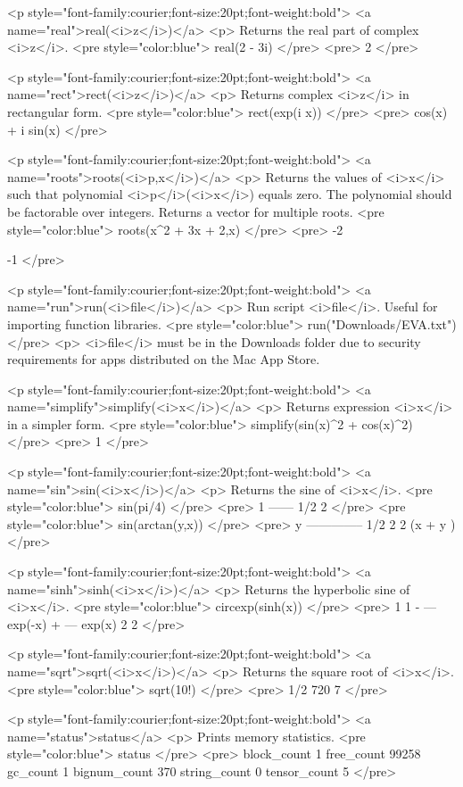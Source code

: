 <p style="font-family:courier;font-size:20pt;font-weight:bold">
<a name="real">real(<i>z</i>)</a>
<p>
Returns the real part of complex <i>z</i>.
<pre style="color:blue">
real(2 - 3i)
</pre>
<pre>
2
</pre>

<p style="font-family:courier;font-size:20pt;font-weight:bold">
<a name="rect">rect(<i>z</i>)</a>
<p>
Returns complex <i>z</i> in rectangular form.
<pre style="color:blue">
rect(exp(i x))
</pre>
<pre>
cos(x) + i sin(x)
</pre>

<p style="font-family:courier;font-size:20pt;font-weight:bold">
<a name="roots">roots(<i>p,x</i>)</a>
<p>
Returns the values of <i>x</i> such that polynomial
<i>p</i>(<i>x</i>) equals zero.
The polynomial should be factorable over integers.
Returns a vector for multiple roots.
<pre style="color:blue">
roots(x^2 + 3x + 2,x)
</pre>
<pre>
-2

-1
</pre>

<p style="font-family:courier;font-size:20pt;font-weight:bold">
<a name="run">run(<i>file</i>)</a>
<p>
Run script <i>file</i>.
Useful for importing function libraries.
<pre style="color:blue">
run("Downloads/EVA.txt")
</pre>
<p>
<i>file</i> must be in the Downloads folder due to security requirements for apps distributed on the Mac App Store.

<p style="font-family:courier;font-size:20pt;font-weight:bold">
<a name="simplify">simplify(<i>x</i>)</a>
<p>
Returns expression <i>x</i> in a simpler form.
<pre style="color:blue">
simplify(sin(x)^2 + cos(x)^2)
</pre>
<pre>
1
</pre>

<p style="font-family:courier;font-size:20pt;font-weight:bold">
<a name="sin">sin(<i>x</i>)</a>
<p>
Returns the sine of <i>x</i>.
<pre style="color:blue">
sin(pi/4)
</pre>
<pre>
  1
------
  1/2
 2
</pre>
<pre style="color:blue">
sin(arctan(y,x))
</pre>
<pre>
      y
--------------
          1/2
   2    2
 (x  + y )
</pre>

<p style="font-family:courier;font-size:20pt;font-weight:bold">
<a name="sinh">sinh(<i>x</i>)</a>
<p>
Returns the hyperbolic sine of <i>x</i>.
<pre style="color:blue">
circexp(sinh(x))
</pre>
<pre>
   1             1
- --- exp(-x) + --- exp(x)
   2             2
</pre>

<p style="font-family:courier;font-size:20pt;font-weight:bold">
<a name="sqrt">sqrt(<i>x</i>)</a>
<p>
Returns the square root of <i>x</i>.
<pre style="color:blue">
sqrt(10!)
</pre>
<pre>
     1/2
720 7
</pre>

<p style="font-family:courier;font-size:20pt;font-weight:bold">
<a name="status">status</a>
<p>
Prints memory statistics.
<pre style="color:blue">
status
</pre>
<pre>
block_count 1
free_count 99258
gc_count 1
bignum_count 370
string_count 0
tensor_count 5
</pre>

